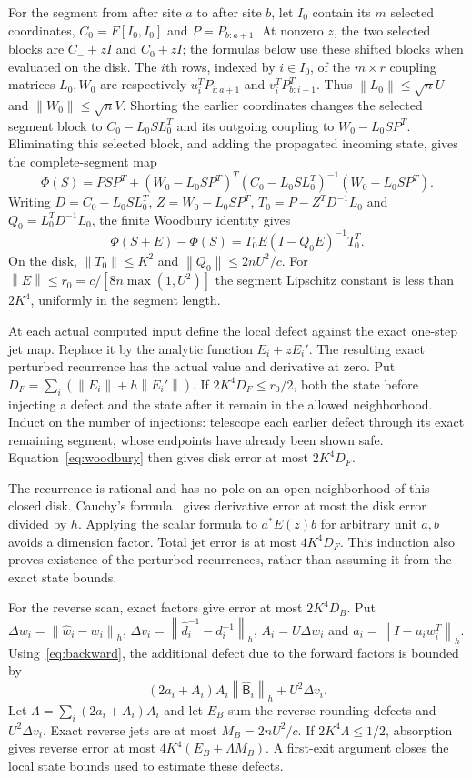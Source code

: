 \documentclass[11pt]{article}
\theoremstyle{remark}\newtheorem{remark}[theorem]{Remark}
\newcommand{\norm}[1]{\left\lVert#1\right\rVert}
\begin{document}
For the segment from after site $a$ to after site $b$, let $I_0$
contain its $m$ selected coordinates, $C_0=F[I_0,I_0]$ and $P=P_{b:a+1}$.
At nonzero $z$, the two selected blocks are $C_-+zI$ and $C_0+zI$;
the formulas below use these shifted blocks when evaluated on the disk.
The $i$th rows, indexed by $i\in I_0$, of the $m\times r$ coupling
matrices $L_0,W_0$ are respectively $u_i^TP_{i:a+1}$ and
$v_i^TP_{b:i+1}^T$. Thus $\norm{L_0}\le\sqrt nU$ and
$\norm{W_0}\le\sqrt nV$. Shorting the earlier coordinates changes
the selected segment block to $C_0-L_0SL_0^T$ and its outgoing
coupling to $W_0-L_0SP^T$. Eliminating this selected block, and adding
the propagated incoming state, gives the complete-segment map
\[
 \Phi(S)=PSP^T+(W_0-L_0SP^T)^T
       (C_0-L_0SL_0^T)^{-1}(W_0-L_0SP^T).
\]
Writing $D=C_0-L_0SL_0^T$, $Z=W_0-L_0SP^T$,
$T_0=P-Z^TD^{-1}L_0$ and $Q_0=L_0^TD^{-1}L_0$, the finite Woodbury
identity gives
\begin{equation}\label{eq:woodbury}
 \Phi(S+E)-\Phi(S)=T_0E(I-Q_0E)^{-1}T_0^T.
\end{equation}
On the disk, $\norm{T_0}\le K^2$ and $\norm{Q_0}\le2nU^2/c$.
For $\norm E\le r_0=c/[8n\max(1,U^2)]$ the segment Lipschitz constant
is less than $2K^4$, uniformly in the segment length.

At each actual computed input define the local defect against the exact
one-step jet map. Replace it by the analytic function $E_i+zE_i'$.
The resulting exact perturbed recurrence has the actual value and derivative
at zero. Put $D_F=\sum_i(\norm{E_i}+h\norm{E_i'})$.
If $2K^4D_F\le r_0/2$, both the state before injecting a defect and the
state after it remain in the allowed neighborhood. Induct on the number of
injections: telescope each earlier defect through its exact remaining segment,
whose endpoints have already been shown safe. Equation~\eqref{eq:woodbury}
then gives disk error at most $2K^4D_F$.

The recurrence is rational and has no pole on an open neighborhood of this
closed disk. Cauchy's formula~\cite[Theorem 16.26]{Cauchy} gives derivative
error at most the disk error divided by $h$. Applying the scalar formula to
$a^*E(z)b$ for arbitrary unit $a,b$ avoids a dimension factor. Total jet
error is at most $4K^4D_F$. This induction also proves existence of the
perturbed recurrences, rather than assuming it from the exact state bounds.

For the reverse scan, exact factors give error at most $2K^4D_B$. Put
$\Delta w_i=\norm{\widehat w_i-w_i}_h$,
$\Delta v_i=\norm{\widehat d_i^{-1}-d_i^{-1}}_h$,
$A_i=U\Delta w_i$ and $a_i=\norm{I-u_iw_i^T}_h$.
Using~\eqref{eq:backward}, the additional defect due to the forward factors
is bounded by
\[
 (2a_i+A_i)A_i\norm{\widehat{\mathsf B}_i}_h+U^2\Delta v_i.
\]
Let $\Lambda=\sum_i(2a_i+A_i)A_i$ and let $E_B$ sum the reverse rounding
defects and $U^2\Delta v_i$. Exact reverse jets are at most
$M_B=2nU^2/c$. If $2K^4\Lambda\le1/2$, absorption gives reverse error
at most $4K^4(E_B+\Lambda M_B)$. A first-exit argument closes the local
state bounds used to estimate these defects.
\end{document}
